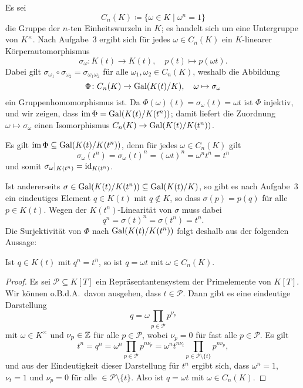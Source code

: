 \documentclass[a4paper,10pt,numbers=noenddot]{scrartcl}
\begin{document}
\section{}

Es sei
\[
            C_n(K)
  \coloneqq \{ \omega \in K \mid \omega^n = 1 \}
\]
die Gruppe der $n$-ten Einheitswurzeln in $K$;
es handelt sich um eine Untergruppe von $K^\times$.
Nach Aufgabe~3 ergibt sich für jedes $\omega \in C_n(K)$ ein $K$-linearer Körperautomorphismus
\[
          \sigma_\omega
  \colon  K(t) \to K(t),
  \quad   p(t) \mapsto p(\omega t).
\]
Dabei gilt $\sigma_{\omega_1} \circ \sigma_{\omega_2} = \sigma_{\omega_1 \omega_2}$ für alle $\omega_1, \omega_2 \in C_n(K)$, weshalb die Abbildung
\[
          \Phi
  \colon  C_n(K) \to \operatorname{Gal}(K(t)/K),
  \quad   \omega \mapsto \sigma_\omega
\]
ein Gruppenhomomorphismus ist.
Da $\Phi(\omega)(t) = \sigma_\omega(t) = \omega t$ ist $\Phi$ injektiv, und wir zeigen, dass $\operatorname{im} \Phi = \operatorname{Gal}(K(t) / K(t^n))$;
damit liefert die Zuordnung $\omega \mapsto \sigma_\omega$ einen Isomorphismus $C_n(K) \to \operatorname{Gal}(K(t) / K(t^n))$.

Es gilt $\operatorname{im} \Phi \subseteq \operatorname{Gal}(K(t) / K(t^n))$,
denn für jedes $\omega \in C_n(K)$ gilt
\[
    \sigma_\omega(t^n)
  = \sigma_\omega(t)^n
  = (\omega t)^n
  = \omega^n t^n
  = t^n
\]
und somit $\sigma_\omega|_{K(t^n)} = \operatorname{id}_{K(t^n)}$.

Ist andererseits $\sigma \in \operatorname{Gal}(K(t)/K(t^n)) \subseteq \operatorname{Gal}(K(t)/K)$, so gibt es nach Aufgabe~3 ein eindeutiges Element $q \in K(t)$ mit $q \notin K$, so dass $\sigma(p) = p(q)$ für alle $p \in K(t)$.
Wegen der $K(t^n)$-Linearität von $\sigma$ muss dabei
\[
    q^n
  = \sigma(t)^n
  = \sigma(t^n)
  = t^n.
\]
Die Surjektivität von $\Phi$ nach $\operatorname{Gal}(K(t)/K(t^n))$ folgt deshalb aus der folgenden Aussage:

\begin{claim}
  Ist $q \in K(t)$ mit $q^n = t^n$, so ist $q = \omega t$ mit $\omega \in C_n(K)$.
\end{claim}
\begin{proof}
  Es sei $\mathcal{P} \subseteq K[T]$ ein Repräsentantensystem der Primelemente von $K[T]$.
  Wir können o.B.d.A.\ davon ausgehen, dass $t \in \mathcal{P}$.
  Dann gibt es eine eindeutige Darstellung
  \[
    q = \omega \prod_{p \in \mathcal{P}} p^{\nu_p}
  \]
  mit $\omega \in K^\times$ und $\nu_p \in \mathbb{Z}$ für alle $p \in \mathcal{P}$, wobei $\nu_p = 0$ für fast alle $p \in \mathcal{P}$.
  Es gilt
  \[
      t^n
    = q^n
    = \omega^n \prod_{p \in \mathcal{P}} p^{n \nu_p}
    = \omega^n t^{n \nu_t} \prod_{p \in \mathcal{P} \setminus \{t\}} p^{n \nu_p},
  \]
  und aus der Eindeutigkeit dieser Darstellung für $t^n$ ergibt sich, dass $\omega^n = 1$, $\nu_t = 1$ und $\nu_p = 0$ für alle $ \in \mathcal{P} \setminus \{t\}$.
  Also ist $q = \omega t$ mit $\omega \in C_n(K)$.
\end{proof}
\end{document}
